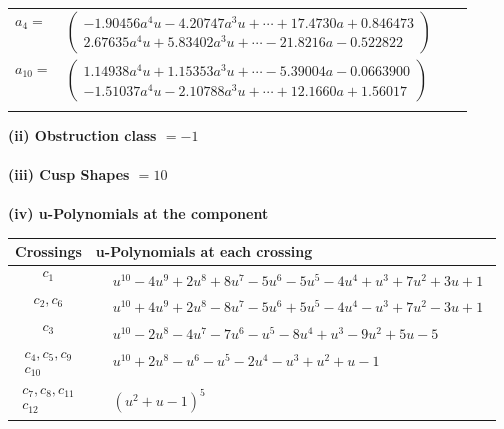 \documentclass[1p]{elsarticle_modified}
\theoremstyle{definition}
\begin{document}
\begin{tabular}{m{7pt} m{180pt} m{7pt} m{180pt} }
\flushright $a_{4}=$&$\begin{pmatrix}-1.90456 a^{4} u-4.20747 a^{3} u+\cdots+17.4730 a+0.846473\\2.67635 a^{4} u+5.83402 a^{3} u+\cdots-21.8216 a-0.522822\end{pmatrix}$ \\
\flushright $a_{10}=$&$\begin{pmatrix}1.14938 a^{4} u+1.15353 a^{3} u+\cdots-5.39004 a-0.0663900\\-1.51037 a^{4} u-2.10788 a^{3} u+\cdots+12.1660 a+1.56017\end{pmatrix}$\\&\end{tabular}
\flushleft \textbf{(ii) Obstruction class $= -1$}\\~\\
\flushleft \textbf{(iii) Cusp Shapes $= 10$}\\~\\
\newpage\renewcommand{\arraystretch}{1}
\flushleft \textbf{(iv) u-Polynomials at the component}\newline \\
\begin{tabular}{m{50pt}|m{274pt}}
Crossings & \hspace{64pt}u-Polynomials at each crossing \\
\hline $$\begin{aligned}c_{1}\end{aligned}$$&$\begin{aligned}
&u^{10}-4 u^9+2 u^8+8 u^7-5 u^6-5 u^5-4 u^4+u^3+7 u^2+3 u+1
\end{aligned}$\\
\hline $$\begin{aligned}c_{2},c_{6}\end{aligned}$$&$\begin{aligned}
&u^{10}+4 u^9+2 u^8-8 u^7-5 u^6+5 u^5-4 u^4- u^3+7 u^2-3 u+1
\end{aligned}$\\
\hline $$\begin{aligned}c_{3}\end{aligned}$$&$\begin{aligned}
&u^{10}-2 u^8-4 u^7-7 u^6- u^5-8 u^4+u^3-9 u^2+5 u-5
\end{aligned}$\\
\hline $$\begin{aligned}c_{4},c_{5},c_{9}\\c_{10}\end{aligned}$$&$\begin{aligned}
&u^{10}+2 u^8- u^6- u^5-2 u^4- u^3+u^2+u-1
\end{aligned}$\\
\hline $$\begin{aligned}c_{7},c_{8},c_{11}\\c_{12}\end{aligned}$$&$\begin{aligned}
&(u^2+u-1)^5
\end{aligned}$\\
\hline
\end{tabular}\\~\\
\end{document}
